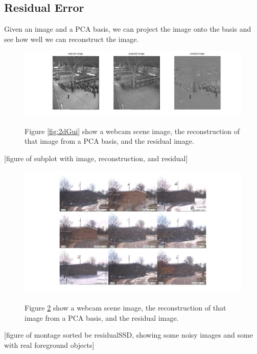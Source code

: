 \subsection{Residual Error}

Given an image and a PCA basis, we can project the image onto the basis and see how well we can reconstruct the image.

\begin{figure}%
	\centering
		\includegraphics[width=1\textwidth]{figures/residualReconstruction.jpg}
	\label{fig:residualReconstruction}
	
		\caption[Residual Reconstruction.]{Figure \ref{fig:2dGui} show a webcam scene image, the reconstruction of that image from a PCA basis, and the residual image.}
\end{figure}

[figure of subplot with image, reconstruction, and residual]

\begin{figure}
	\centering
		\includegraphics[width=1\textwidth]{figures/residualSSDmontage.jpg}
	\label{fig:residualSSDmontage}
	
		\caption[Residual SSD Montage.]{Figure \ref{fig:residualSSDmontage} show a webcam scene image, the reconstruction of that image from a PCA basis, and the residual image.}
\end{figure}

[figure of montage sorted be residualSSD, showing some noisy images and some with real foreground objects]


